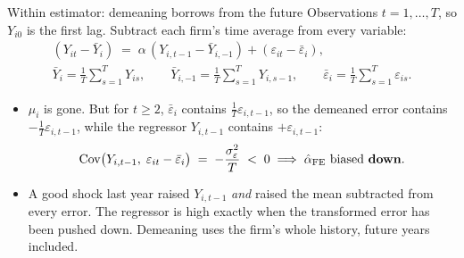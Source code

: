 \documentclass[
  11pt,
  ignorenonframetext,
  aspectratio=169,
]{beamer}
\providecommand{\tightlist}{%
  \setlength{\itemsep}{0pt}\setlength{\parskip}{0pt}}
\begin{document}
\begin{frame}{Within estimator: demeaning borrows from the future}
\protect{}\label{within-estimator-demeaning-borrows-from-the-future}
Observations \(t = 1, \dots, T\), so \(Y_{i0}\) is the first lag.
Subtract each firm's time average from every variable: \[
\begin{gathered}
(Y_{it} - \bar Y_i) \;=\; \alpha\,(Y_{i,t-1} - \bar Y_{i,-1}) + (\varepsilon_{it} - \bar\varepsilon_i), \\[0.3em]
\bar Y_i = \tfrac{1}{T}\textstyle\sum_{s=1}^{T} Y_{is},\qquad
\bar Y_{i,-1} = \tfrac{1}{T}\textstyle\sum_{s=1}^{T} Y_{i,s-1},\qquad
\bar\varepsilon_i = \tfrac{1}{T}\textstyle\sum_{s=1}^{T} \varepsilon_{is}.
\end{gathered}
\]

\begin{itemize}
\tightlist
\item
  \(\mu_i\) is gone. But for \(t \ge 2\), \(\bar\varepsilon_i\) contains
  \(\tfrac{1}{T}\varepsilon_{i,t-1}\), so the demeaned error contains
  \(-\tfrac{1}{T}\varepsilon_{i,t-1}\), while the regressor
  \(Y_{i,t-1}\) contains \(+\varepsilon_{i,t-1}\): \[
  \operatorname{Cov}\!\big(Y_{i,t-1},\; \varepsilon_{it} - \bar\varepsilon_i\big) \;=\; -\frac{\sigma^2_\varepsilon}{T} \;<\; 0 \;\Longrightarrow\; \hat\alpha_{\text{FE}} \text{ biased \textbf{down}}.
  \]
\item
  A good shock last year raised \(Y_{i,t-1}\) \emph{and} raised the mean
  subtracted from every error. The regressor is high exactly when the
  transformed error has been pushed down. Demeaning uses the firm's
  whole history, future years included.
\end{itemize}
\end{frame}
\end{document}
